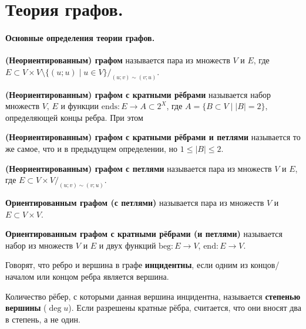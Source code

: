 \documentclass{article}
\begin{document}
    \tableofcontents\pagebreak
    \section{Теория графов.}
    \paragraph{Основные определения теории графов.}
    \begin{definition}
        \textbf{(Неориентированным) графом} называется пара из множеств $V$ и $E$, где $E\subset V\times V\setminus\{(u;u)\mid u\in V\}/_{(u;v)\sim(v;u)}$.
    \end{definition}
    \begin{definition}
        \textbf{(Неориентированным) графом с кратными рёбрами} называется набор множеств $V$, $E$ и функции $\mathrm{ends}\colon E\to A\subset 2^X$, где $A=\{B\subset V\mid |B|=2\}$, определяющей концы ребра. При этом 
    \end{definition}
    \begin{definition}
        \textbf{(Неориентированным) графом с кратными рёбрами и петлями} называется то же самое, что и в предыдущем определении, но $1\leqslant|B|\leqslant2$.
    \end{definition}
    \begin{definition}
        \textbf{(Неориентированным) графом с петлями} называется пара из множеств $V$ и $E$, где $E\subset V\times V/_{(u;v)\sim(v;u)}$.
    \end{definition}
    \begin{definition}
        \textbf{Ориентированным графом (с петлями)} называется пара из множеств $V$ и $E\subset V\times V$.
    \end{definition}
    \begin{definition}
        \textbf{Ориентированным графом с кратными рёбрами (и петлями)} называется набор из множеств $V$ и $E$ и двух функций $\mathrm{beg}\colon E\to V$, $\mathrm{end}\colon E\to V$.
    \end{definition}
    \begin{definition}
        Говорят, что ребро и вершина в графе \textbf{инцидентны}, если одним из концов/началом или концом ребра является вершина.
    \end{definition}
    \begin{definition}
        Количество рёбер, с которыми данная вершина инцидентна, называется \textbf{степенью вершины} ($\deg u$). Если разрешены кратные рёбра, считается, что они вносят два в степень, а не один.
    \end{definition}
\end{document}
